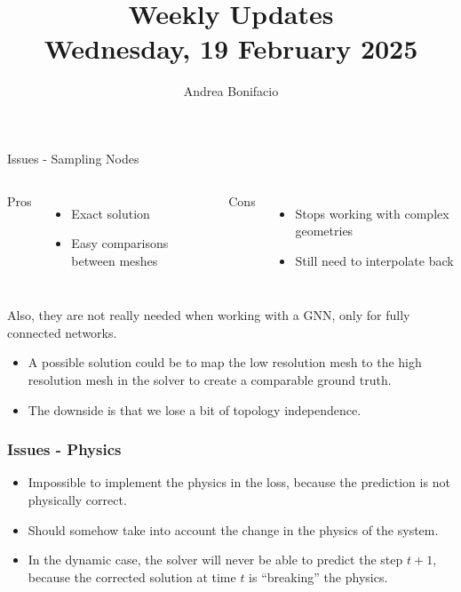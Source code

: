 \documentclass{beamer}
\title{Weekly Updates\\
\tiny{Wednesday, 19 February 2025}}
\author{Andrea Bonifacio}
\date{}
\begin{document}
\begin{frame}
\titlepage
\end{frame}


\begin{frame}{Issues - Sampling Nodes}
    \begin{columns}
        \centering Pros
        \begin{itemize}
            \item Exact solution
            \item Easy comparisons between meshes
        \end{itemize}
        \centering Cons
        \begin{itemize}
            \item Stops working with complex geometries
            \item Still need to interpolate back
        \end{itemize}
    \end{columns}

    \vspace{1cm}

    Also, they are not really needed when working with a GNN, only for fully connected networks.
    \begin{itemize}
        \item A possible solution could be to map the low resolution mesh to the high resolution mesh in the solver to create a comparable ground truth.
        \item The downside is that we lose a bit of topology independence.
    \end{itemize}  

\end{frame}



\begin{frame}
\frametitle{Issues - Physics}
\begin{itemize}
    \item Impossible to implement the physics in the loss, because the prediction is not physically correct.
    \item Should somehow take into account the change in the physics of the system.
    \item In the dynamic case, the solver will never be able to predict the step \(t+1\), because the corrected solution at time \(t\) is ``breaking'' the physics.
\end{itemize}
\end{frame}
\end{document}
